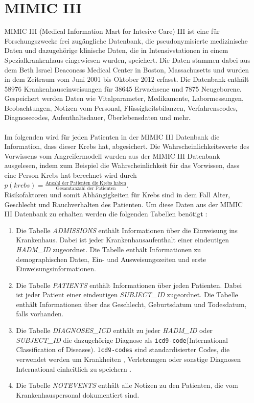 \documentclass[german,version-2020-11]{uzl-thesis}
\begin{document}
\section{MIMIC III}
MIMIC III (Medical Information Mart for Intesive Care) III \cite{12} ist eine für Forschungszwecke frei zugängliche Datenbank, die pseudonymisierte medizinische Daten und dazugehörige klinische Daten, die in Intensivstationen in einem Spezialkrankenhaus eingewiesen wurden, speichert. Die Daten stammen dabei aus dem Beth Israel Deaconess Medical Center in Boston, Massachusetts und wurden in dem Zeitraum vom Juni 2001 bis Oktober 2012 erfasst. Die Datenbank enthält 58976 Krankenhauseinweisungen für 38645 Erwachsene und 7875 Neugeborene. Gespeichert werden Daten wie Vitalparameter, Medikamente, Labormessungen, Beobachtungen, Notizen vom Personal, Flüssigkeitsbilanzen, Verfahrenscodes, Diagnosecodes, Aufenthaltsdauer, Überlebensdaten und mehr.  \\ \\ 
Im folgenden wird für jeden Patienten in der MIMIC III Datenbank die Information, dass dieser Krebs hat, abgesichert. Die Wahrscheinlichkeitswerte des Vorwissens vom Angreifermodell wurden aus der MIMIC III Datenbank ausgelesen, indem zum Beispiel die Wahrscheinlichkeit für das Vorwissen, dass eine Person Krebs hat berechnet wird durch $
p(krebs) =  \frac{\text{Anzahl der Patienten die Krebs haben}}{\text{Gesamtanzahl der Patienten}}$. \\ 
Risikofaktoren und somit Abhängigkeiten für Krebs sind in dem Fall Alter, Geschlecht und Rauchverhalten des Patienten\cite{13,14}. Um diese Daten aus der MIMIC III Datenbank zu erhalten werden die folgenden Tabellen benötigt : 
\begin{enumerate}
	\item Die Tabelle \textit{ADMISSIONS} enthält Informationen über die Einweisung ins Krankenhaus. Dabei ist jeder Krankenhausaufenthalt einer eindeutigen \textit{HADM\_ID} zugeordnet. Die Tabelle enthält Informationen zu demographischen Daten, Ein- und Ausweisungszeiten und erste Einweisungsinformationen.
	\item Die Tabelle \textit{PATIENTS} enthält Informationen über jeden Patienten. Dabei ist jeder Patient einer eindeutigen \textit{SUBJECT\_ID} zugeordnet. Die Tabelle enthält Informationen über das Geschlecht, Geburtsdatum und Todesdatum, falls vorhanden.
	\item Die Tabelle \textit{DIAGNOSES\_ICD} enthält zu jeder \textit{HADM\_ID} oder \textit{SUBJECT\_ID} die dazugehörige Diagnose als \texttt{icd9-code}(International Classification of Diseases). \texttt{Icd9-codes} sind standardisierter Codes, die verwendet  werden um Krankheiten , Verletzungen oder sonstige Diagnosen International einheitlich zu speichern \cite{15}.
	\item Die Tabelle \textit{NOTEVENTS} enthält alle Notizen zu den Patienten, die vom Krankenhauspersonal dokumentiert sind.
\end{enumerate} 
\end{document}
